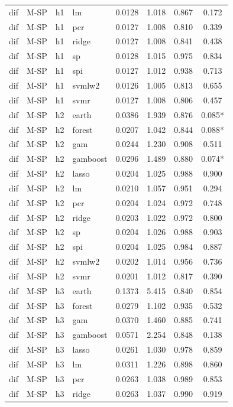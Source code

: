 \begin{ThreePartTable}
\begin{longtable}[t]{llclcccc}
dif & M-SP & h1 & lm & 0.0128 & 1.018 & 0.867 & 0.172\\
dif & M-SP & h1 & pcr & 0.0127 & 1.008 & 0.810 & 0.339\\
dif & M-SP & h1 & ridge & 0.0127 & 1.008 & 0.841 & 0.438\\
dif & M-SP & h1 & sp & 0.0128 & 1.015 & 0.975 & 0.834\\
dif & M-SP & h1 & spi & 0.0127 & 1.012 & 0.938 & 0.713\\
dif & M-SP & h1 & svmlw2 & 0.0126 & 1.005 & 0.813 & 0.655\\
dif & M-SP & h1 & svmr & 0.0127 & 1.008 & 0.806 & 0.457\\
\addlinespace
dif & M-SP & h2 & earth & 0.0386 & 1.939 & 0.876 & 0.085*\\
dif & M-SP & h2 & forest & 0.0207 & 1.042 & 0.844 & 0.088*\\
dif & M-SP & h2 & gam & 0.0244 & 1.230 & 0.908 & 0.511\\
dif & M-SP & h2 & gamboost & 0.0296 & 1.489 & 0.880 & 0.074*\\
dif & M-SP & h2 & lasso & 0.0204 & 1.025 & 0.988 & 0.900\\
dif & M-SP & h2 & lm & 0.0210 & 1.057 & 0.951 & 0.294\\
dif & M-SP & h2 & pcr & 0.0204 & 1.024 & 0.972 & 0.748\\
dif & M-SP & h2 & ridge & 0.0203 & 1.022 & 0.972 & 0.800\\
dif & M-SP & h2 & sp & 0.0204 & 1.026 & 0.988 & 0.903\\
dif & M-SP & h2 & spi & 0.0204 & 1.025 & 0.984 & 0.887\\
dif & M-SP & h2 & svmlw2 & 0.0202 & 1.014 & 0.956 & 0.736\\
dif & M-SP & h2 & svmr & 0.0201 & 1.012 & 0.817 & 0.390\\
\addlinespace
dif & M-SP & h3 & earth & 0.1373 & 5.415 & 0.840 & 0.854\\
dif & M-SP & h3 & forest & 0.0279 & 1.102 & 0.935 & 0.532\\
dif & M-SP & h3 & gam & 0.0370 & 1.460 & 0.885 & 0.741\\
dif & M-SP & h3 & gamboost & 0.0571 & 2.254 & 0.848 & 0.138\\
dif & M-SP & h3 & lasso & 0.0261 & 1.030 & 0.978 & 0.859\\
dif & M-SP & h3 & lm & 0.0311 & 1.226 & 0.898 & 0.860\\
dif & M-SP & h3 & pcr & 0.0263 & 1.038 & 0.989 & 0.853\\
dif & M-SP & h3 & ridge & 0.0263 & 1.037 & 0.990 & 0.919\\

\end{longtable}
\end{ThreePartTable}

